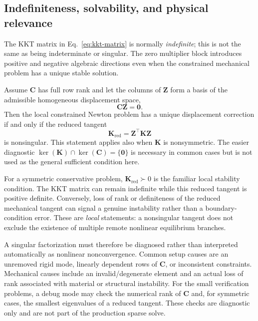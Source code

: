\documentclass[11pt,a4paper]{article}
\newcommand{\vct}[1]{\mathbf{#1}}
\begin{document}
\subsection{Indefiniteness, solvability, and physical relevance}
\label{sec:kkt-solvability}

The KKT matrix in Eq.~\eqref{eq:kkt-matrix} is normally \emph{indefinite}; this is not the same as being indeterminate or singular. The zero multiplier block introduces positive and negative algebraic directions even when the constrained mechanical problem has a unique stable solution.

Assume $\vct C$ has full row rank and let the columns of $\vct Z$ form a basis of the admissible homogeneous displacement space,
\begin{equation}
\vct C\vct Z=\vct0.
\end{equation}
Then the local constrained Newton problem has a unique displacement correction if and only if the reduced tangent
\begin{equation}
\boxed{\vct K_{\mathrm{red}}=\vct Z^\top\vct K\vct Z}
\label{eq:Kred}
\end{equation}
is nonsingular. This statement applies also when $\vct K$ is nonsymmetric. The easier diagnostic $\ker(\vct K)\cap\ker(\vct C)=\{\vct0\}$ is necessary in common cases but is not used as the general sufficient condition here.

For a symmetric conservative problem, $\vct K_{\mathrm{red}}\succ0$ is the familiar local stability condition. The KKT matrix can remain indefinite while this reduced tangent is positive definite. Conversely, loss of rank or definiteness of the reduced mechanical tangent can signal a genuine instability rather than a boundary-condition error. These are \emph{local} statements: a nonsingular tangent does not exclude the existence of multiple remote nonlinear equilibrium branches.

A singular factorization must therefore be diagnosed rather than interpreted automatically as nonlinear nonconvergence. Common setup causes are an unremoved rigid mode, linearly dependent rows of $\vct C$, or inconsistent constraints. Mechanical causes include an invalid/degenerate element and an actual loss of rank associated with material or structural instability. For the small verification problems, a debug mode may check the numerical rank of $\vct C$ and, for symmetric cases, the smallest eigenvalues of a reduced tangent. These checks are diagnostic only and are not part of the production sparse solve.
\end{document}
